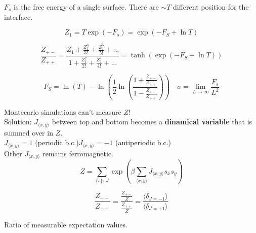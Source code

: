\documentclass[12pt,handout]{beamer}
\begin{document}
\begin{frame}
\begin{center}

$F_s$ is the free energy of a single surface. There are $\sim T$ different position for the interface.

\[Z_1 = T \exp \left( - F_s \right) = \exp \left( -F_S +\ln T \right) \]

\[ \frac{Z_{+-}}{Z_{++}} = \frac{Z_1 + \frac{Z_1^3}{3!} + \frac{Z_1^5}{5!} + ...}{1 +  \frac{Z_1^2}{2!} + \frac{Z_1^4}{4!} + ...} = \tanh \left( \exp \left( -F_S +\ln T \right) \right) \]

\[
F_S = \ln \left( T \right) - \ln \left( \frac{1}{2} \ln \left( \frac{1 + \frac{Z_{+-}}{Z_{++}}}{1 - \frac{Z_{+-}}{Z_{++}}} \right) \right) \quad \sigma = \lim_{L \rightarrow \infty} \frac{F_s}{L^2} \]

\end{center}
\end{frame}

\begin{frame}
\begin{center}
{\Large Montecarlo simulations can't measure $Z$!\\}
\vspace{10pt}
Solution: $J_{\langle x, y \rangle}$ between top and bottom becomes a \textbf{dinamical variable} that is summed over in $Z$.\\
$J_{\langle x, y \rangle} = 1$ (periodic b.c.)\hspace{10pt}$J_{\langle x, y \rangle} = -1$ (antiperiodic b.c.)\\
Other $J_{\langle x, y \rangle}$ remains ferromagnetic.
\[
Z = \sum_{\lbrace s \rbrace, \, J} \exp \left( \beta \sum_{\langle x, y \rangle} J_{\langle x, y \rangle} s_x s_y \right)
\]

{\large \[
\frac{Z_{+-}}{Z_{++}} = \frac{\frac{Z_{+-}}{Z}}{\frac{Z_{++}}{Z}}=\frac{\langle \delta_{J = -1} \rangle}{\langle \delta_{J = + 1} \rangle}
\]}

Ratio of measurable expectation values.
\end{center}
\end{frame}
\end{document}
